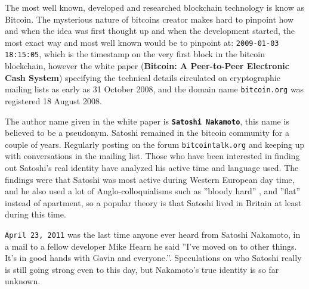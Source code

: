 The most well known, developed and researched blockchain technology is know as Bitcoin. The mysterious nature of bitcoins creator makes hard to pinpoint how and when the idea was first thought up and when the development started, the most exact way and most well known would be to pinpoint at: \texttt{2009-01-03 18:15:05}\cite{genesis}, which is the timestamp on the very first block in the bitcoin blockchain, however the white paper (\textbf{Bitcoin: A Peer-to-Peer Electronic Cash System})\cite{nakamoto_bitcoin} specifying the technical details circulated on cryptographic mailing lists as early as 31 October 2008, and the domain name \texttt{bitcoin.org} was registered 18 August 2008.\cite{bernard_2018}


The author name given in the white paper is \textbf{\texttt{Satoshi Nakamoto}}, this name is believed to be a pseudonym. Satoshi remained in the bitcoin community for a couple of years. Regularly posting on the forum \texttt{bitcointalk.org} and keeping up with conversations in the mailing list. Those who have been interested in finding out Satoshi's real identity have analyzed his active time and language used. The findings were that Satoshi was most active during Western European day time, and he also used a lot of Anglo-colloquialisms such as ''bloody hard'' \cite{nakamoto_bloody}, and ''flat'' instead of apartment, so a popular theory is that Satoshi lived in Britain at least during this time.\cite{bernard_2018}

\texttt{April 23, 2011} was the last time anyone ever heard from Satoshi Nakamoto, in a mail to a fellow developer Mike Hearn he said ''I've moved on to other things.  It's in good hands with Gavin and everyone.''.\cite{nakamoto_last_mail} Speculations on who Satoshi really is still going strong even to this day, but Nakamoto's true identity is so far unknown.\cite{bernard_2018}\cite{jeffries_2013}